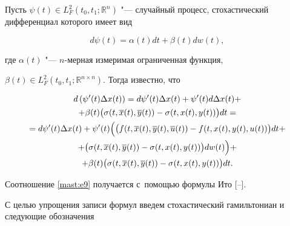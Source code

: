 Пусть $ \psi (t)\in L^{2}_{F}(t_{0}, t_{1}; \mathbb R^{n}) $ "--- случайный процесс, стохастический дифференциал которого  имеет вид

$$

d\psi(t)=\alpha (t) dt+\beta (t) d w(t), 

$$

где $ \alpha (t) $ "--- $ n $-мерная измеримая  ограниченная функция, 

$ \beta (t)\in L^{2}_{F}(t_{0}, t_{1}; \mathbb R^{n\times n}) $. Тогда известно, что 

\begin{multline}

\label{mast:e9}

d \left( \psi'(t) \Delta x(t) \right)=d \psi'(t) \Delta x(t)+\psi'(t) d \Delta x(t)+

\\ +\beta (t)\bigl( \sigma (t, \overline{x}(t), \overline{y}(t))-\sigma (t,x(t),y(t))  \bigr) dt= \\

=d \psi'(t) \Delta x(t)+\psi'(t) 

\Bigl( \bigl( f(t, \overline{x}(t), \overline{y}(t), \overline{u}(t))-f(t,x(t),y(t), u(t))\bigr) dt+\\

+ \bigl( \sigma (t, \overline{x}(t), \overline{y}(t))-\sigma (t,x(t),y(t))\bigr) dw(t) \Bigr)+

\\ +\beta (t)\bigl( \sigma (t, \overline{x}(t), \overline{y}(t))-\sigma (t,x(t),y(t))  \bigr) dt.   

\end{multline}

Соотношение \eqref{mast:e9} получается с~помощью формулы Ито [--].



С целью упрощения  записи формул введем стохастический гамильтониан и следующие обозначения

